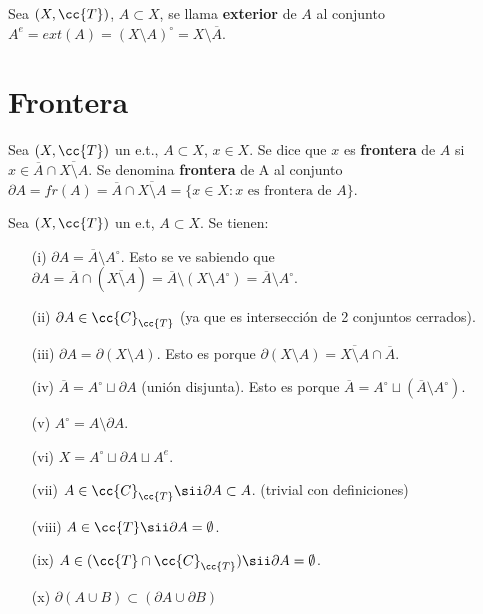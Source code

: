 \begin{definicion}
    Sea $(X, \cc{T})$, $A\subset X$, se llama \textbf{exterior} de $A$ al conjunto $A^e = ext(A) = (X\setminus A)^\circ = X \setminus \overline{A}$.
    \endsquare
\end{definicion}

\section{Frontera}

\begin{definicion}
    Sea $(X, \cc{T})$ un e.t., $A\subset X$, $x\in X$. Se dice que $x$ es \textbf{frontera} de $A$ si $x\in \overline{A}\cap \overline{X\setminus A}$. Se denomina \textbf{frontera} de A al conjunto $\partial A = fr(A) =\overline{A}\cap \overline{X\setminus A} = \{x\in X : x\text{ es frontera de }A\}$.
    \endsquare
\end{definicion}

\begin{prop}
    Sea $(X, \cc{T})$ un e.t, $A\subset X$. Se tienen:
    \begin{enumerate}
        \item[(i)] $\partial A = \overline{A}\setminus A^\circ$. Esto se ve sabiendo que $\partial A = \overline{A}\cap (\overline{X\setminus A}) = \overline{A}\setminus (X\setminus A^\circ) = \overline{A}\setminus A^\circ$.
        \item[(ii)] $\partial A \in \cc{C}_{\cc{T}}$ (ya que es intersección de 2 conjuntos cerrados).
        \item[(iii)] $\partial A = \partial (X\setminus A)$. Esto es porque $\partial (X\setminus A) = \overline{X\setminus A}\cap \overline{A}$.
        \item[(iv)] $\overline{A} = A^\circ \sqcup \partial A$ (unión disjunta). Esto es porque $\overline{A} = A^\circ\sqcup (\overline{A}\setminus A^\circ)$.
        \item[(v)] $A^\circ = A \setminus \partial A$.
        \item[(vi)] $X = A^\circ\sqcup \partial A \sqcup A^e$.
        \item[(vii)] $A \in \cc{C}_{\cc{T}} \sii \partial A \subset A$. (trivial con definiciones) %
        \item[(viii)] $A \in \cc{T} \sii \partial A = \emptyset$.
        \item[(ix)] $A\in (\cc{T}\cap \cc{C}_{\cc{T}}) \sii \partial A = \emptyset$.
        \item[(x)] $\partial (A\cup B) \subset (\partial A \cup \partial B)$
    \end{enumerate}
    \endsquare
\end{prop}

